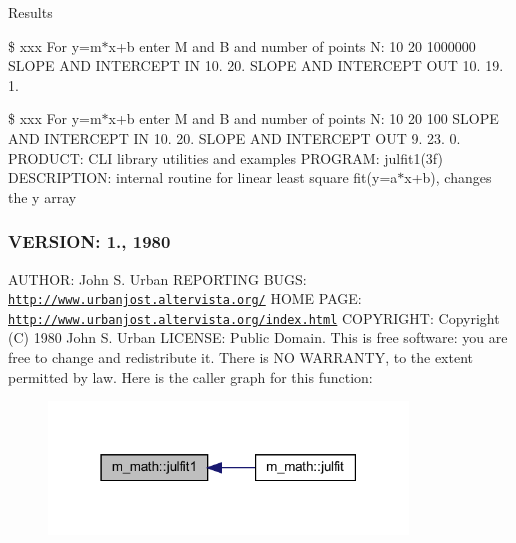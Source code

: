 Results

\$ xxx For y=m$\ast$x+b enter M and B and number of points N\+: 10 20 1000000 S\+L\+O\+PE A\+ND I\+N\+T\+E\+R\+C\+E\+PT IN 10. 20. S\+L\+O\+PE A\+ND I\+N\+T\+E\+R\+C\+E\+PT O\+UT 10. 19. 1.

\$ xxx For y=m$\ast$x+b enter M and B and number of points N\+: 10 20 100 S\+L\+O\+PE A\+ND I\+N\+T\+E\+R\+C\+E\+PT IN 10. 20. S\+L\+O\+PE A\+ND I\+N\+T\+E\+R\+C\+E\+PT O\+UT 9. 23. 0. P\+R\+O\+D\+U\+CT\+: C\+LI library utilities and examples P\+R\+O\+G\+R\+AM\+: julfit1(3f) D\+E\+S\+C\+R\+I\+P\+T\+I\+ON\+: internal routine for linear least square fit(y=a$\ast$x+b), changes the y array \subsubsection*{V\+E\+R\+S\+I\+ON\+: 1., 1980}

A\+U\+T\+H\+OR\+: John S. Urban R\+E\+P\+O\+R\+T\+I\+NG B\+U\+GS\+: \href{http://www.urbanjost.altervista.org/}{\tt http\+://www.\+urbanjost.\+altervista.\+org/} H\+O\+ME P\+A\+GE\+: \href{http://www.urbanjost.altervista.org/index.html}{\tt http\+://www.\+urbanjost.\+altervista.\+org/index.\+html} C\+O\+P\+Y\+R\+I\+G\+HT\+: Copyright (C) 1980 John S. Urban L\+I\+C\+E\+N\+SE\+: Public Domain. This is free software\+: you are free to change and redistribute it. There is NO W\+A\+R\+R\+A\+N\+TY, to the extent permitted by law. Here is the caller graph for this function\+:
\nopagebreak
\begin{figure}[H]
\begin{center}
\leavevmode
\includegraphics[width=271pt]{namespacem__math_a9a1a7478c87dda7eb126127970f70b7b_icgraph}
\end{center}
\end{figure}
\mbox{\label{namespacem__math_a506d6c6d2e4da1fa5efb731608531c75}} 
